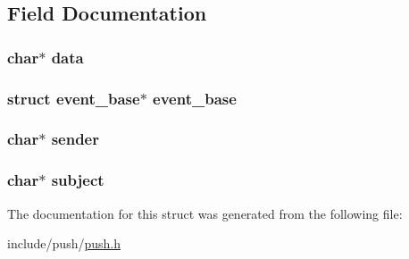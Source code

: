\subsection{Field Documentation}
\hypertarget{structpush__info_a91a70b77df95bd8b0830b49a094c2acb}{
\subsubsection[{data}]{\setlength{\rightskip}{0pt plus 5cm}char$\ast$ data}}\label{structpush__info_a91a70b77df95bd8b0830b49a094c2acb}
\hypertarget{structpush__info_ac1c1d71aa37cb71608f4f802bb85b200}{
\subsubsection[{event\-\_\-base}]{\setlength{\rightskip}{0pt plus 5cm}struct event\-\_\-base$\ast$ event\-\_\-base}}\label{structpush__info_ac1c1d71aa37cb71608f4f802bb85b200}
\hypertarget{structpush__info_ab092ba1f84e458809eb91a5786b281de}{
\subsubsection[{sender}]{\setlength{\rightskip}{0pt plus 5cm}char$\ast$ sender}}\label{structpush__info_ab092ba1f84e458809eb91a5786b281de}
\hypertarget{structpush__info_ae31ac864419a577c2982907c23b426d3}{
\subsubsection[{subject}]{\setlength{\rightskip}{0pt plus 5cm}char$\ast$ subject}}\label{structpush__info_ae31ac864419a577c2982907c23b426d3}


The documentation for this struct was generated from the following file\-:\begin{DoxyCompactItemize}
\item 
include/push/\hyperlink{push_8h}{push.\-h}\end{DoxyCompactItemize}
